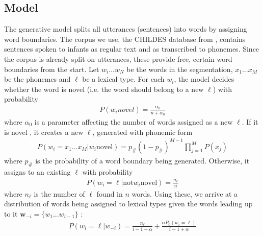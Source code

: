 \documentclass[11pt]{article}
\begin{document}
\subsection{Model}
The generative model splits all utterances (sentences) into words by assigning word boundaries. The corpus we use, the CHILDES database from \cite{mac1985}, contains sentences spoken to infants as regular text and as transcribed to phonemes. Since the corpus is already split on utterances, these provide free, certain word boundaries from the start. Let $w_i ... w_N$ be the words in the segmentation, $x_1 ... x_M$ be the phonemes and $\ell$ be a lexical type. For each $w_i$, the model decides whether the word is novel (i.e. the word should belong to a new $\ell$) with probability
\begin{align}
P(w_i novel) = \frac{\alpha_0}{n+\alpha_0}
\end{align}
where $\alpha_0$ is a parameter affecting the number of words assigned as a new $\ell$. If it is novel , it creates a new $\ell$, generated with phonemic form
\begin{align}
P(w_i = x_1 ... x_M | w_i  \text{novel}) = p_\# (1-p_\#)^{M-1} \prod_{j=1}^M P(x_j)
\end{align}
where $p_\#$ is the probability of a word boundary being generated. Otherwise, it assigns to an existing $\ell$ with probability
\begin{align}
P(w_i = \ell | \text{not} w_i \text{novel}) = \frac{n_\ell}{n}
\end{align}
where $n_\ell$ is the number of $\ell$ found in $n$ words. Using these, we arrive at a distribution of words being assigned to lexical types given the words leading up to it $\textbf{w}_{-i} = \{ w_1 ... w_{i-1}\}$ :
\begin{align}
P(w_i = \ell | w_{-i}) = \frac{n_\ell}{i-1+\alpha} + \frac{\alpha P_0 (w_i = \ell )}{i - 1 + \alpha}
\end{align}
\end{document}
